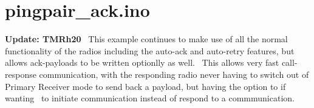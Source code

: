\hypertarget{pingpair_ack_8ino-example}{}\section{pingpair\+\_\+ack.\+ino}
{\bfseries Update\+: T\+M\+Rh20}~\newline
 This example continues to make use of all the normal functionality of the radios including the auto-\/ack and auto-\/retry features, but allows ack-\/payloads to be written optionlly as well.~\newline
 This allows very fast call-\/response communication, with the responding radio never having to switch out of Primary Receiver mode to send back a payload, but having the option to if wanting~\newline
 to initiate communication instead of respond to a commmunication.


